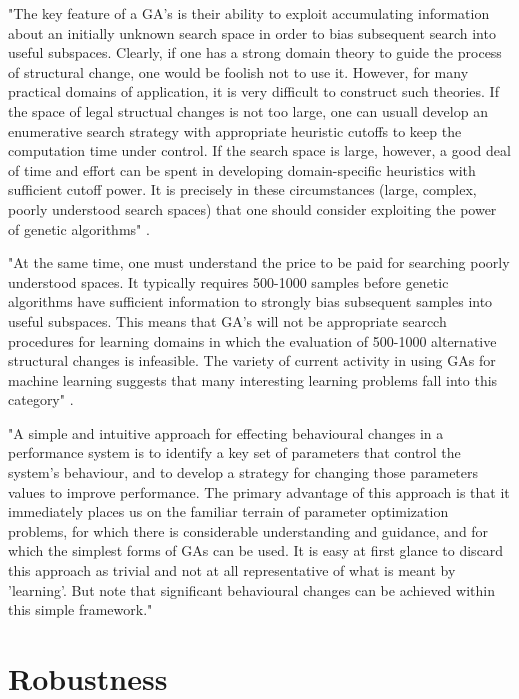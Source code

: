 "The key feature of a GA's is their ability to exploit accumulating information about an initially unknown search space in order to bias subsequent search into useful subspaces. Clearly, if one has a strong domain theory to guide the process of structural change, one would be foolish not to use it. However, for many practical domains of application, it is very difficult to construct such theories. If the space of legal structual changes is not too large, one can usuall develop an enumerative search strategy with appropriate heuristic cutoffs to keep the computation time under control. If the search space is large, however, a good deal of time and effort can be spent in developing domain-specific heuristics with sufficient cutoff power. It is precisely in these circumstances (large, complex, poorly understood search spaces) that one should consider exploiting the power of genetic algorithms" \cite{de1988learning}.

"At the same time, one must understand the price to be paid for searching poorly understood spaces. It typically requires 500-1000 samples before genetic algorithms have sufficient information to strongly bias subsequent samples into useful subspaces. This means that GA's will not be appropriate searcch procedures for learning domains in which the evaluation of 500-1000 alternative structural changes is infeasible. The variety of current activity in using GAs for machine learning suggests that many interesting learning problems fall into this category" \cite{de1988learning}.

"A simple and intuitive approach for effecting behavioural changes in a performance system is to identify a key set of parameters that control the system's behaviour, and to develop a strategy for changing those parameters values to improve performance. The primary advantage of this approach is that it immediately places us on the familiar terrain of parameter optimization problems, for which there is considerable understanding and guidance, and for which the simplest forms of GAs can be used. It is easy at first glance to discard this approach as trivial and not at all representative of what is meant by 'learning'. But note that significant behavioural changes can be achieved within this simple framework."




\section{Robustness}

